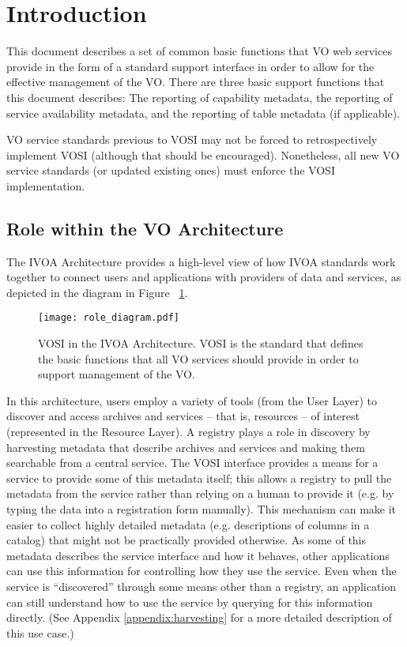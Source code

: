 \documentclass[11pt,letter]{ivoa}
\begin{document}
\section{Introduction}
\label{sec:introduction}

This document describes a set of common basic functions that VO web
services provide in the form of a standard support interface in order to
allow for the effective management of the VO.  There are three basic
support functions that this document describes:  The reporting of
capability metadata, the reporting of service availability metadata, and
the reporting of table metadata (if applicable).

VO service standards previous to VOSI may not be forced to
retrospectively implement VOSI (although that should be encouraged).
Nonetheless, all new VO service standards (or updated existing ones)
must enforce the VOSI implementation.


\subsection{Role within the VO Architecture}

The IVOA Architecture \citep{2021ivoa.spec.1101D} provides a high-level
view of how IVOA standards work together to connect users and
applications with providers of data and services, as depicted in the
diagram in Figure ~\ref{fig:archdiag}. 

\begin{figure}
\centering
\texttt{[image: role\_diagram.pdf]}
\caption{VOSI in the IVOA Architecture. VOSI is the standard that
defines the basic functions that all VO services should provide in order
to support management of the VO.}
\label{fig:archdiag}
\end{figure}

In this architecture, users employ a variety of tools (from the User
Layer) to discover and access archives and services -- that is,
resources -- of interest (represented in the Resource Layer). A registry
plays a role in discovery by harvesting metadata that describe archives
and services and making them searchable from a central service. The VOSI
interface provides a means for a service to provide some of this
metadata itself; this allows a registry to pull the metadata from the
service rather than relying on a human to provide it (e.g. by typing the
data into a registration form manually). This mechanism can make it
easier to collect highly detailed metadata (e.g. descriptions of columns
in a catalog) that might not be practically provided otherwise. As some
of this metadata describes the service interface and how it behaves,
other applications can use this information for controlling how they use
the service. Even when the service is ``discovered'' through some means
other than a registry, an application can still understand how to use
the service by querying for this information directly. (See Appendix
\ref{appendix:harvesting} for a more detailed description of this use
case.)
\end{document}
